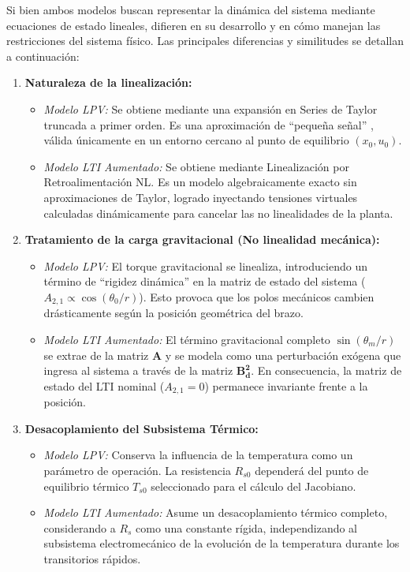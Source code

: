 \documentclass[12pt, a4paper,journal, onecolumn, compsoc]{IEEEtran}
\begin{document}
Si bien ambos modelos buscan representar la dinámica del sistema mediante ecuaciones de estado lineales, difieren en su desarrollo y en cómo manejan las restricciones del sistema físico. Las principales diferencias y similitudes se detallan a continuación:

\begin{enumerate}
    \item \textbf{Naturaleza de la linealización:}
    \begin{itemize}
        \item \textit{Modelo LPV:} Se obtiene mediante una expansión en Series de Taylor truncada a primer orden. Es una aproximación de ``pequeña señal'' \cite{franklin_feedback}, válida únicamente en un entorno cercano al punto de equilibrio $(x_0, u_0)$.
        \item \textit{Modelo LTI Aumentado:} Se obtiene mediante Linealización por Retroalimentación NL. Es un modelo algebraicamente exacto sin aproximaciones de Taylor, logrado inyectando tensiones virtuales calculadas dinámicamente para cancelar las no linealidades de la planta.
    \end{itemize}
    
    \item \textbf{Tratamiento de la carga gravitacional (No linealidad mecánica):}
    \begin{itemize}
        \item \textit{Modelo LPV:} El torque gravitacional se linealiza, introduciendo un término de ``rigidez dinámica'' en la matriz de estado del sistema ($A_{2,1} \propto \cos(\theta_0/r)$). Esto provoca que los polos mecánicos cambien drásticamente según la posición geométrica del brazo.
        \item \textit{Modelo LTI Aumentado:} El término gravitacional completo $\sin(\theta_m/r)$ se extrae de la matriz $\mathbf{A}$ y se modela como una perturbación exógena que ingresa al sistema a través de la matriz $\mathbf{B_d^2}$. En consecuencia, la matriz de estado del LTI nominal ($A_{2,1} = 0$) permanece invariante frente a la posición.
    \end{itemize}

    \item \textbf{Desacoplamiento del Subsistema Térmico:}
    \begin{itemize}
        \item \textit{Modelo LPV:} Conserva la influencia de la temperatura como un parámetro de operación. La resistencia $R_{s0}$ dependerá del punto de equilibrio térmico $T_{s0}$ seleccionado para el cálculo del Jacobiano.
        \item \textit{Modelo LTI Aumentado:} Asume un desacoplamiento térmico completo, considerando a $R_s$ como una constante rígida, independizando al subsistema electromecánico de la evolución de la temperatura durante los transitorios rápidos.
    \end{itemize}


\end{enumerate}
\end{document}
